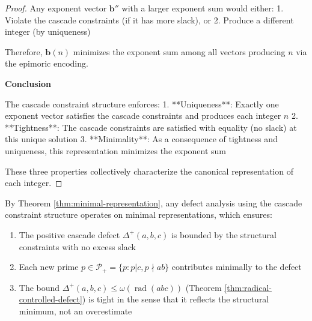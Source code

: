 \begin{proof}
Any exponent vector $\mathbf{b}''$ with a larger exponent sum would either:
1. Violate the cascade constraints (if it has more slack), or
2. Produce a different integer (by uniqueness)

Therefore, $\mathbf{b}(n)$ minimizes the exponent sum among all vectors producing $n$ via the epimoric encoding.

\noindent \textbf{Conclusion}

The cascade constraint structure enforces:
1. **Uniqueness**: Exactly one exponent vector satisfies the cascade constraints and produces each integer $n$
2. **Tightness**: The cascade constraints are satisfied with equality (no slack) at this unique solution
3. **Minimality**: As a consequence of tightness and uniqueness, this representation minimizes the exponent sum

These three properties collectively characterize the canonical representation of each integer.

\end{proof}

\begin{corollary}
\label{cor:minimal-defect-bound}

By Theorem \ref{thm:minimal-representation}, any defect analysis using the cascade constraint structure operates on minimal representations, which ensures:

\begin{enumerate}
\item The positive cascade defect $\Delta^{+}(a,b,c)$ is bounded by the structural constraints with no excess slack
\item Each new prime $p \in \mathcal{P}_+ = \{p : p|c, p \nmid ab\}$ contributes minimally to the defect
\item The bound $\Delta^{+}(a,b,c) \leq \omega(\operatorname{rad}(abc))$ (Theorem \ref{thm:radical-controlled-defect}) is tight in the sense that it reflects the structural minimum, not an overestimate
\end{enumerate}

\end{corollary}
